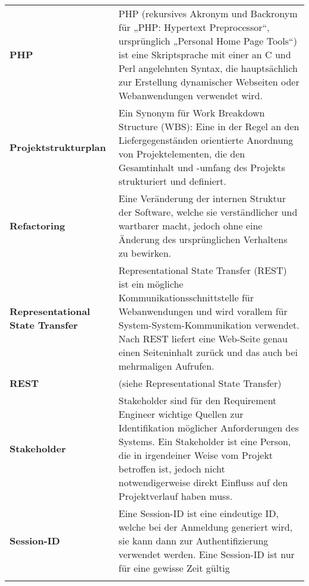 \begin{longtable}{>{\raggedright}m{3cm}m{11cm}}
	\textbf{PHP}&
	PHP (rekursives Akronym und Backronym für „PHP: Hypertext Preprocessor“, ursprünglich „Personal Home Page Tools“) ist eine Skriptsprache mit einer an C und Perl angelehnten Syntax, die hauptsächlich zur Erstellung dynamischer Webseiten oder Webanwendungen verwendet wird.\cite{wiki_php}\\ \addlinespace	

	\textbf{Projektstrukturplan}&
	Ein Synonym für Work Breakdown Structure (WBS): Eine in der Regel an den Liefergegenständen orientierte Anordnung von Projektelementen, die den Gesamtinhalt und -umfang des Projekts strukturiert und definiert.\cite{proj_mgmt_book}\\ \addlinespace	

	\textbf{Refactoring}&
	Eine Veränderung der internen Struktur der Software, welche sie verständlicher und wartbarer macht, jedoch ohne eine Änderung des ursprünglichen Verhaltens zu bewirken.\cite{feathers2004working}\\ \addlinespace		

	\textbf{Representational State Transfer}&
	Representational State Transfer (REST) ist ein mögliche Kommunikationsschnittstelle für Webanwendungen und wird vorallem für System-System-Kommunikation verwendet. Nach REST liefert eine Web-Seite genau einen Seiteninhalt zurück und das auch bei mehrmaligen Aufrufen.\\ \addlinespace

	\textbf{REST}&
	(siehe Representational State Transfer)\\ \addlinespace

	\textbf{Stakeholder}&
	 Stakeholder sind für den Requirement Engineer wichtige Quellen zur Identifikation möglicher Anforderungen des Systems.\cite{req_eng_book} Ein Stakeholder ist eine Person, die in irgendeiner Weise vom Projekt betroffen ist, jedoch nicht notwendigerweise direkt Einfluss auf den Projektverlauf haben muss.\\ \addlinespace		

	\textbf{Session-ID}&
	Eine Session-ID ist eine eindeutige ID, welche bei der Anmeldung generiert wird, sie kann dann zur Authentifizierung verwendet werden. Eine Session-ID ist nur für eine gewisse Zeit gültig \\ \addlinespace		

\end{longtable}
